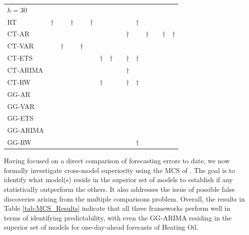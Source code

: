 \documentclass[12pt,a4paper]{article}
\begin{document}
\begin{table}[!htbp]
\begin{centering}
\begin{tabular}{@{}lcccccccccccccc@{}}
{$h=30$}     &   &   &   &   &   &   &   &   &   &   &   &   &   &    \\
RT       & $\dagger$ &   & $\dagger$ &   & $\dagger$ &   &   &   &   & $\dagger$ &   &   &   &    \\
CT-AR    &   &   &   &   &   &   &   &   & $\dagger$ &   & $\dagger$ &   & $\dagger$ & $\dagger$  \\
CT-VAR   &   & $\dagger$ &   & $\dagger$ &   &   &   &   &   &   &   &   &   &    \\
CT-ETS   &   &   &   &   &   & $\dagger$ & $\dagger$ &   & $\dagger$ & $\dagger$ &   &   &   &    \\
CT-ARIMA &   &   &   &   &   &   &   &   & $\dagger$ &   &   &   &   &    \\
CT-RW    &   &   &   &   &   & $\dagger$ &   &   & $\dagger$ & $\dagger$ &   &   &   &   \\
GG-AR    &   &   &   &   &   &   &   &   &   &   &   &   &   &    \\
GG-VAR   &   &   &   &   &   &   &   &   &   &   &   &   &   &    \\
GG-ETS   &   &   &   &   &   &   &   &   &   &   &   &   &   &    \\
GG-ARIMA &   &   &   &   &   &   &   &   &   &   &   &   &   &                        \\
GG-RW    &   &   &   &   &   &   &   &   &   &   $\dagger$ &   &   &   &                      \\
\bottomrule
\end{tabular}
\par\end{centering}{\footnotesize \par}
\end{table}

Having focused on a direct comparison of forecasting errors to date, we now formally investigate cross-model superiority using the MCS of \cite{HLN11}. The goal is to identify what model(s) reside in the superior set of models to establish if any statistically outperform the others. It also addresses the issue of possible false discoveries arising from the multiple comparisons problem. Overall, the results in Table \ref{tab:MCS_Results} indicate that all three frameworks perform well in terms of identifying predictability, with even the GG-ARIMA residing in the superior set of models for one-day-ahead forecasts of Heating Oil. 
\end{document}
